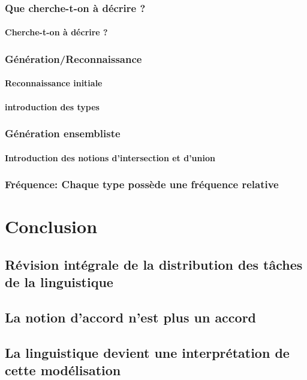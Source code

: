 \documentclass[11pt,a4paper]{book}
\begin{document}
\section{Que cherche-t-on à décrire ?}
\subsection{Cherche-t-on à décrire ?}
\section{Génération/Reconnaissance}
\subsection{Reconnaissance initiale}
\subsection{introduction des types}
\section{Génération ensembliste}
\subsection{Introduction des notions d'intersection et d'union}
\section{Fréquence: Chaque type possède une fréquence relative}


\part{Conclusion}
\chapter{Révision intégrale de la distribution des tâches de la linguistique}
\chapter{La notion d'accord n'est plus un accord}
\chapter{La linguistique devient une interprétation de cette modélisation}
\end{document}
